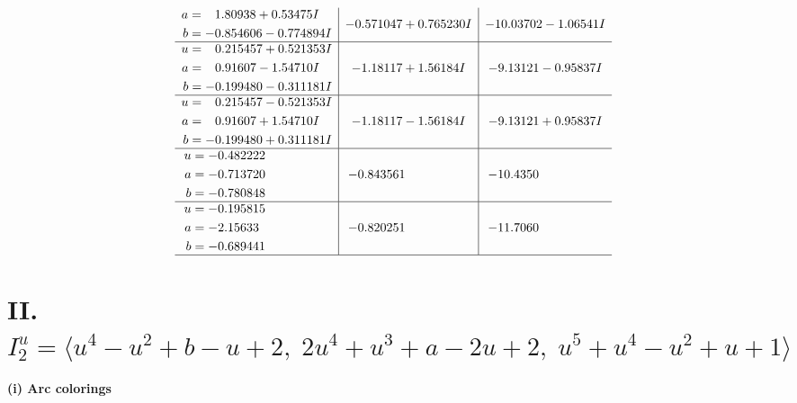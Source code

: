 \documentclass[1p]{elsarticle_modified}
\theoremstyle{definition}
\begin{document}
$$\begin{array}{c|c|c}
\begin{aligned}
a &= \phantom{-}1.80938 + 0.53475 I \\
b &= -0.854606 - 0.774894 I\end{aligned}
 & -0.571047 + 0.765230 I & -10.03702 - 1.06541 I \\ \hline\begin{aligned}
u &= \phantom{-}0.215457 + 0.521353 I \\
a &= \phantom{-}0.91607 - 1.54710 I \\
b &= -0.199480 - 0.311181 I\end{aligned}
 & -1.18117 + 1.56184 I & -9.13121 - 0.95837 I \\ \hline\begin{aligned}
u &= \phantom{-}0.215457 - 0.521353 I \\
a &= \phantom{-}0.91607 + 1.54710 I \\
b &= -0.199480 + 0.311181 I\end{aligned}
 & -1.18117 - 1.56184 I & -9.13121 + 0.95837 I \\ \hline\begin{aligned}
u &= -0.482222\phantom{ +0.000000I} \\
a &= -0.713720\phantom{ +0.000000I} \\
b &= -0.780848\phantom{ +0.000000I}\end{aligned}
 & -0.843561\phantom{ +0.000000I} & -10.4350\phantom{ +0.000000I} \\ \hline\begin{aligned}
u &= -0.195815\phantom{ +0.000000I} \\
a &= -2.15633\phantom{ +0.000000I} \\
b &= -0.689441\phantom{ +0.000000I}\end{aligned}
 & -0.820251\phantom{ +0.000000I} & -11.7060\phantom{ +0.000000I}\\
 \hline 
 \end{array}$$\newpage\newpage\renewcommand{\arraystretch}{1}
\centering \section*{II. $I^u_{2}= \langle u^4- u^2+b- u+2,\;2 u^4+u^3+a-2 u+2,\;u^5+u^4- u^2+u+1 \rangle$}
\flushleft \textbf{(i) Arc colorings}\\
\end{document}
